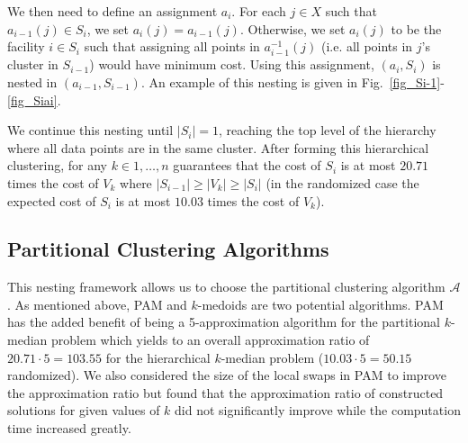 \documentclass[conference, 10pt, final]{IEEEtran}
\begin{document}
We then need to define an assignment $a_i$. For each $j \in X$ such that $a_{i-1}(j) \in S_{i}$, we set $a_i(j) = a_{i-1}(j)$. Otherwise, we set $a_i(j)$ to be the facility $i \in S_i$ such that assigning all points in $a_{i-1}^{-1}(j)$ (i.e. all points in $j$'s cluster in $S_{i-1}$) would have minimum cost. Using this assignment, $(a_i, S_i)$ is nested in $(a_{i-1}, S_{i-1})$. An example of this nesting is given in Fig.~\ref{fig_Si-1}-\ref{fig_Siai}.

We continue this nesting until $|S_i| = 1$, reaching the top level of the hierarchy where all data points are in the same cluster. After forming this hierarchical clustering, for any $k \in 1, \ldots, n$ \cite{Lin} guarantees that the cost of $S_i$ is at most $20.71$ times the cost of $V_k$ where $|S_{i-1}| \geq |V_k| \geq |S_{i}|$ (in the randomized case the expected cost of $S_i$ is at most $10.03$ times the cost of $V_k$).


\subsection{Partitional Clustering Algorithms}
This nesting framework allows us to choose the partitional clustering algorithm $\mathcal{A}$. As mentioned above, PAM and $k$-medoids are two potential algorithms. PAM has the added benefit of being a 5-approximation algorithm for the partitional $k$-median problem which yields to an overall approximation ratio of $20.71 \cdot 5 = 103.55$ for the hierarchical $k$-median problem ($10.03 \cdot 5 = 50.15$ randomized). We also considered the size of the local swaps in PAM to improve the approximation ratio but found that the approximation ratio of constructed solutions for given values of $k$ did not significantly improve while the computation time increased greatly. 
\end{document}
